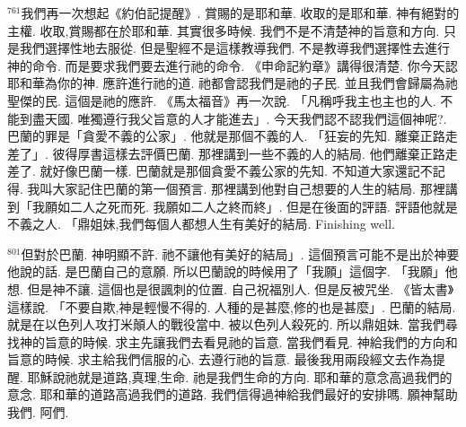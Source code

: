 \documentclass{book}
\begin{document}
$^{761}$我們再一次想起《約伯記提醒》.
賞賜的是耶和華.
收取的是耶和華.
神有絕對的主權.
收取,賞賜都在於耶和華.
其實很多時候.
我們不是不清楚神的旨意和方向.
只是我們選擇性地去服從.
但是聖經不是這樣教導我們.
不是教導我們選擇性去進行神的命令.
而是要求我們要去進行祂的命令.
《申命記約章》講得很清楚.
你今天認耶和華為你的神.
應許進行祂的道.
祂都會認我們是祂的子民.
並且我們會歸屬為祂聖傑的民.
這個是祂的應許.
《馬太福音》再一次說.
「凡稱呼我主也主也的人.
不能到盡天國.
唯獨遵行我父旨意的人才能進去」.
今天我們認不認我們這個神呢?.
巴蘭的罪是「貪愛不義的公家」.
他就是那個不義的人.
「狂妄的先知.
離棄正路走差了」.
彼得厚書這樣去評價巴蘭.
那裡講到一些不義的人的結局.
他們離棄正路走差了.
就好像巴蘭一樣.
巴蘭就是那個貪愛不義公家的先知.
不知道大家還記不記得.
我叫大家記住巴蘭的第一個預言.
那裡講到他對自己想要的人生的結局.
那裡講到「我願如二人之死而死.
我願如二人之終而終」.
但是在後面的評語.
評語他就是不義之人.
「鼎姐妹,我們每個人都想人生有美好的結局.
Finishing well.

$^{801}$但對於巴蘭.
神明顯不許.
祂不讓他有美好的結局」.
這個預言可能不是出於神要他說的話.
是巴蘭自己的意願.
所以巴蘭說的時候用了「我願」這個字.
「我願」他想.
但是神不讓.
這個也是很諷刺的位置.
自己祝福別人.
但是反被咒坐.
《皆太書》這樣說.
「不要自欺,神是輕慢不得的.
人種的是甚麼,修的也是甚麼」.
巴蘭的結局.
就是在以色列人攻打米顛人的戰役當中.
被以色列人殺死的.
所以鼎姐妹.
當我們尋找神的旨意的時候.
求主先讓我們去看見祂的旨意.
當我們看見.
神給我們的方向和旨意的時候.
求主給我們信服的心.
去遵行祂的旨意.
最後我用兩段經文去作為提醒.
耶穌說祂就是道路,真理,生命.
祂是我們生命的方向.
耶和華的意念高過我們的意念.
耶和華的道路高過我們的道路.
我們信得過神給我們最好的安排嗎.
願神幫助我們.
阿們.
\newpage
\end{document}
